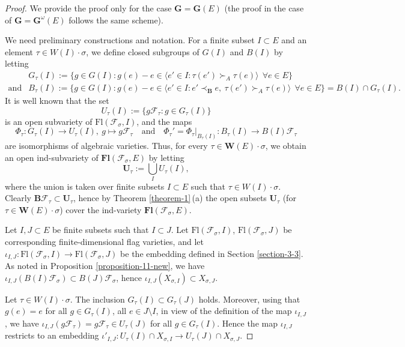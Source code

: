 \documentclass[12pt]{amsart}
\theoremstyle{definition}
\begin{document}
\begin{proof}
We provide the proof only for the case $\mathbf{G}=\mathbf{G}(E)$
(the proof in the case of $\mathbf{G}=\mathbf{G}^\omega(E)$ follows
the same scheme).

We need preliminary constructions and notation.
For a finite subset $I\subset E$ and an element $\tau\in
W(I)\cdot\sigma$, we define closed subgroups of $G(I)$ and $B(I)$ by letting
\begin{eqnarray*}
 & G_\tau(I):=\{g\in G(I):g(e)-e\in\langle e'\in I:\tau(e')\succ_A\tau(e)\rangle\ \ \forall e\in E\}\\
\mbox{and}
& B_\tau(I):=\{g\in G(I):g(e)-e\in\langle e'\in I:e'\prec_\mathbf{B}e,\ \tau(e')\succ_A\tau(e)\rangle\ \ \forall e\in E\}=B(I)\cap G_\tau(I).
\end{eqnarray*}
It is well known that the set
\[U_\tau(I):=\{g\mathcal{F}_\tau:g\in G_\tau(I)\}\]
is an open subvariety of $\mathrm{Fl}(\mathcal{F}_\sigma,I)$,
and the maps
\[\Phi_\tau:G_\tau(I)\to U_\tau(I),\ g\mapsto g\mathcal{F}_\tau\quad\mbox{and}\quad \Phi_\tau'=\Phi_\tau|_{B_\tau(I)}:B_\tau(I)\to B(I)\mathcal{F}_\tau\]
are isomorphisms of algebraic varieties. Thus, for every
$\tau\in\mathbf{W}(E)\cdot\sigma$, we obtain an open ind-subvariety
of $\mathbf{Fl}(\mathcal{F}_\sigma,E)$ by letting
\[\mathbf{U}_\tau:=\bigcup_{I}U_\tau(I),\]
where the union is taken over finite subsets $I\subset E$ such that $\tau\in W(I)\cdot\sigma$.
Clearly $\mathbf{B}\mathcal{F}_\tau\subset\mathbf{U}_\tau$, hence by
Theorem \ref{theorem-1}\,{\rm (a)} the open subsets
$\mathbf{U}_\tau$ (for $\tau\in\mathbf{W}(E)\cdot\sigma$) cover the
ind-variety $\mathbf{Fl}(\mathcal{F}_\sigma,E)$.

Let $I,J\subset E$ be finite subsets such that $I\subset J$. Let
$\mathrm{Fl}(\mathcal{F}_\sigma,I)$,
$\mathrm{Fl}(\mathcal{F}_\sigma,J)$ be corresponding
finite-dimensional flag varieties, and let
$\iota_{I,J}:\mathrm{Fl}(\mathcal{F}_\sigma,I)\to
\mathrm{Fl}(\mathcal{F}_\sigma,J)$ be the embedding defined in
Section \ref{section-3-3}. As noted in Proposition
\ref{proposition-11-new},
 we have $\iota_{I,J}(B(I)\mathcal{F}_\sigma)\subset B(J)\mathcal{F}_\sigma$,
hence $\iota_{I,J}(X_{\sigma,I})\subset X_{\sigma,J}$.

Let $\tau\in W(I)\cdot\sigma$. The inclusion $G_\tau(I)\subset
G_\tau(J)$ holds. Moreover, using that $g(e)=e$ for all $g\in
G_\tau(I)$, all $e\in J\setminus I$, in view of the definition of
the map $\iota_{I,J}$, we have
$\iota_{I,J}(g\mathcal{F}_\tau)=g\mathcal{F}_\tau\in U_\tau(J)$ for
all $g\in G_\tau(I)$. Hence the map $\iota_{I,J}$ restricts to an
embedding $\iota'_{I,J}:U_{\tau}(I)\cap X_{\sigma,I}\to
U_{\tau}(J)\cap X_{\sigma,J}$.


\end{proof}
\end{document}
